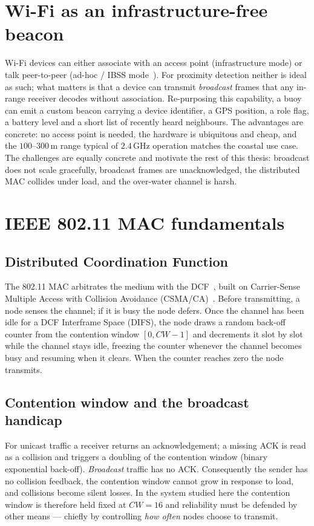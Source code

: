 \documentclass[12pt,a4paper,oneside]{report}
\begin{document}
\section{Wi-Fi as an infrastructure-free beacon}
Wi-Fi devices can either associate with an access point (infrastructure mode) or
talk peer-to-peer (ad-hoc / IBSS mode~\cite{ipcisco-ibss}). For proximity
detection neither is ideal as such; what matters is that a device can transmit
\emph{broadcast} frames that any in-range receiver decodes without association.
Re-purposing this capability, a buoy can emit a custom beacon carrying a device
identifier, a GPS position, a role flag, a battery level and a short list of
recently heard neighbours. The advantages are concrete: no access point is
needed, the hardware is ubiquitous and cheap, and the $100$--$300$\,m range
typical of $2.4$\,GHz operation matches the coastal use case. The challenges are
equally concrete and motivate the rest of this thesis: broadcast does not
scale gracefully, broadcast frames are unacknowledged, the distributed MAC
collides under load, and the over-water channel is harsh.

\section{IEEE 802.11 MAC fundamentals}
\subsection{Distributed Coordination Function}
The 802.11 MAC arbitrates the medium with the DCF~\cite{sharetechnote-dcf},
built on Carrier-Sense Multiple Access with Collision Avoidance
(CSMA/CA)~\cite{csma-ca}. Before transmitting, a node senses the channel; if it
is busy the node defers. Once the channel has been idle for a DCF Interframe
Space (DIFS), the node draws a random back-off counter from the contention
window $[0,CW-1]$ and decrements it slot by slot while the channel stays idle,
freezing the counter whenever the channel becomes busy and resuming when it
clears. When the counter reaches zero the node transmits.

\subsection{Contention window and the broadcast handicap}
For unicast traffic a receiver returns an acknowledgement; a missing ACK is read
as a collision and triggers a doubling of the contention window (binary
exponential back-off). \emph{Broadcast} traffic has no ACK. Consequently the
sender has no collision feedback, the contention window cannot grow in response
to load, and collisions become silent losses. In the system studied here the
contention window is therefore held fixed at $CW=16$ and reliability must be
defended by other means --- chiefly by controlling \emph{how often} nodes
choose to transmit.
\end{document}
